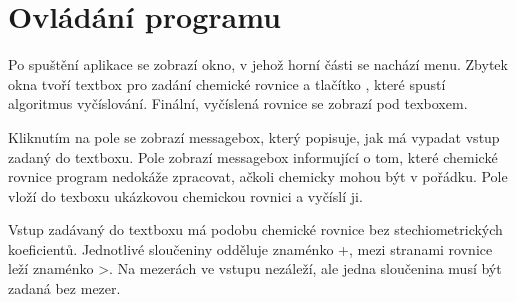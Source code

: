 \documentclass[12pt,a4paper]{report}
\begin{document}
\chapter{Ovládání programu}
Po spuštění aplikace se zobrazí okno, v jehož horní části se nachází menu. Zbytek okna tvoří textbox pro zadání chemické rovnice a tlačítko , které spustí algoritmus vyčíslování. Finální, vyčíslená rovnice se zobrazí pod texboxem.

Kliknutím na pole  se zobrazí messagebox, který popisuje, jak má vypadat vstup zadaný do textboxu. Pole  zobrazí messagebox informující o tom, které chemické rovnice program nedokáže zpracovat, ačkoli chemicky mohou být v pořádku. Pole  vloží do texboxu ukázkovou chemickou rovnici a vyčíslí ji.

Vstup zadávaný do textboxu má podobu chemické rovnice bez stechiometrických koeficientů. Jednotlivé sloučeniny odděluje znaménko +, mezi stranami rovnice leží znaménko >. Na mezerách ve vstupu nezáleží, ale jedna sloučenina musí být zadaná bez mezer.
\end{document}
